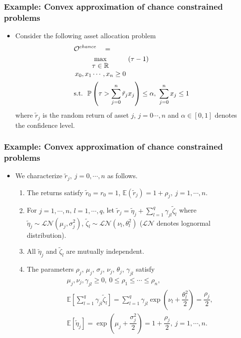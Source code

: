 \documentclass{beamer}
\begin{document}
\begin{frame}
	\frametitle{Example: Convex approximation of chance constrained problems}
	\begin{itemize}
		\item Consider the following asset allocation problem
		\begin{align} \label{investment_problem}
		\begin{split}
		& \mathcal{O}^{chance}\quad=\\
		&\max_{\begin{matrix}
			\tau \in \mathbb{R}\\ 	
			x_0, x_1\cdots,x_n \geq 0
			\end{matrix}}\ (\tau - 1)\ \ \\ 
		& \textnormal{s.t.}\ \ \mathbb{P} \left(\tau > \sum_{j=0}^n \tilde r_j x_j \right) \leq \alpha,\ \sum_{j=0}^{n} x_j \leq 1
		\end{split}
		\end{align}
		where $\tilde{r}_j$ is the random return of asset $j$, $j=0\cdots,n$ and $\alpha \in [0,1]$ denotes the confidence level.
	\end{itemize}
\end{frame}

\begin{frame}
	\frametitle{Example: Convex approximation of chance constrained problems}
	\begin{itemize}
		\item We characterize $\tilde{r}_j,\ j=0,\cdots,n$ as follows.
		\begin{enumerate}
			\item The returns satisfy $\tilde r_0=r_0=1$, $\mathbb{E}(\tilde r_j) = 1 + \rho_j,\ j=1,\cdots,n$.
			
			\item For $j=1,\cdots,n$,  $l=1,\cdots,q$, let $\tilde r_j = \tilde\eta_j + \sum_{l=1}^q \gamma_{jl}\tilde\zeta_l$ where $\tilde\eta_j \sim \mathcal{LN}(\mu_j, \sigma_j^2)$, $\tilde\zeta_l \sim \mathcal{LN}(\nu_l, \theta_l^2)$ ($\mathcal{LN}$ denotes lognormal distribution).\\[1ex]
			
			\item All $\tilde\eta_j$ and $\tilde\zeta_l$ are mutually independent.
			
			\item The parameters $\rho_j$, $\mu_j$, $\sigma_j$, $\nu_j$, $\theta_j$, $\gamma_{jl}$ satisfy
			\begin{align*}
			&\mu_j, \nu_j, \gamma_{jl} \geq 0,\ 0\leq \rho_1 \leq \cdots \leq \rho_n,\\[1ex]
			&\mathbb{E}\left[\sum_{l=1}^q \gamma_{jl} \tilde\zeta_l\right] =  \sum_{l=1}^q \gamma_{jl} \exp \left(\nu_l + \dfrac{\theta_l^2}{2}\right) = \dfrac{\rho_j}{2},\\[1ex]
			&\mathbb{E}\left[\tilde\eta_j\right] = \exp\left(\mu_j + \dfrac{\sigma_j^2}{2}\right) = 1 + \dfrac{\rho_j}{2},\ j =1,\cdots, n.
			\end{align*}
		\end{enumerate}
	\end{itemize}
\end{frame}
\end{document}
